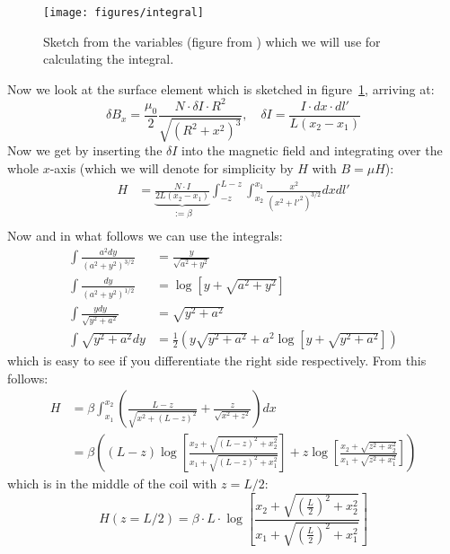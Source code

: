 \begin{figure}
    \begin{centering}
        \texttt{[image: figures/integral]}
\caption{Sketch from the variables (figure from \cite{staatsexamen}) which we will use
            for calculating the integral. 
            }
        \label{fig:integral}
    \end{centering}
\end{figure}
Now we look at the surface element which is sketched in figure~\ref{fig:integral},
arriving at:
\begin{equation}
 \delta B_x =  \frac{\mu_0}{2} \frac{N \cdot \delta I  \cdot R^2}{\sqrt{\left (R^2 + x^2 \right )^3}} ,
 \quad \delta I = \frac{ I \cdot dx \cdot dl'}{L(x_2 - x_1)}
\end{equation}
Now we get by inserting the $\delta I$ into the magnetic field and integrating over
the whole $x$-axis (which we will denote for simplicity by $H$ with $B = \mu H$):
\begin{align}
    H &= \underbrace{ \frac{ N\cdot I}{2 L (x_2 - x_1)} }_{:=\beta}
    \int^{L-z}_{-z} \int^{x_1}_{x_2} \frac{x^2}{(x^2 + l'^2)^{3/2}} dx dl'\\
\end{align}
Now and in what follows we can use the integrals:
\begin{align}
    \int \frac{a^2 dy}{(a^2 + y^2)^{3/2}}&=  \frac{y}{\sqrt{a^2 + y^2}} \\
    \int \frac{dy}{(a^2 + y^2)^{1/2}} &=  \log{\left [ y + \sqrt{a^2 + y^2} \right]}\\
    \int \frac{y dy}{\sqrt{y^2 + a^2}} &= \sqrt{y^2 + a^2} \\
    \int \sqrt{y^2 + a^2} dy &= \frac{1}{2} \left(
    y \sqrt{ y^2 + a^2} + a^2 \log \left [ y + \sqrt{y^2 + a^2} \right ] 
        \right )
\end{align}
which is easy to see if you differentiate the right side respectively. From this follows:
\begin{align}
    H &= \beta  \int^{x_2}_{x_1} \left (  \frac{L - z}{\sqrt{x^2 + (L-z)^2}} +
      \frac{z}{\sqrt{x^2 + z^2}}    \right ) dx  \\
  &= \beta  \left (
  (L-z) \log{\left [ \frac{x_2 + \sqrt{(L-z)^2 + x_2^2}} { x_1 + \sqrt{(L-z)^2 + x_1^2}} \right]}
  +z \log{\left [ \frac{x_2 + \sqrt{z^2 + x_2^2}} { x_1 + \sqrt{z^2 + x_1^2}} \right]}
  \right)
\end{align}
which is in the middle of the coil with $z = L/2$:
\begin{equation}
    H(z = L/2) = \beta \cdot L \cdot
    \log{\left [ \frac{x_2 + \sqrt{(\frac{L}{2})^2+ x_2^2}} { x_1 + \sqrt{(\frac{L}{2})^2 + x_1^2}} \right]}
\end{equation}
